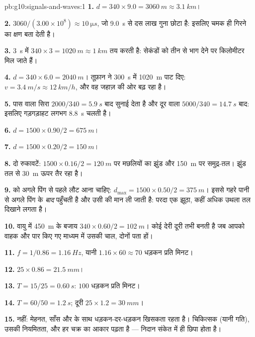 \begin{solution}{pb:g10:signals-and-waves:1}
\textbf{1.} $d = 340 \times 9.0 = \qty{3060}{m} \approx \qty{3.1}{km}$।

\textbf{2.} $3060/(3.00\times10^{8}) \approx \qty{10}{\micro s}$, जो \qty{9.0}{s} से दस लाख गुना छोटा है: इसलिए चमक ही
गिरने का क्षण बता देती है।

\textbf{3.} \qty{3}{s} में  $340 \times 3 = \qty{1020}{m}
\approx \qty{1}{km}$ तय करती है: सेकंडों को तीन
से भाग देने पर किलोमीटर मिल जाते हैं।

\textbf{4.} $d = 340 \times 6.0 = \qty{2040}{m}$। तूफ़ान ने \qty{300}{s} में \qty{1020}{m} पाट दिए: $v = \qty{3.4}{m/s} \approx
\qty{12}{km/h}$, और
वह जहाज़ की ओर बढ़ रहा है।

\textbf{5.} पास वाला सिरा $2000/340 = \qty{5.9}{s}$ बाद सुनाई देता है और दूर वाला $5000/340 = \qty{14.7}{s}$
बाद: इसलिए गड़गड़ाहट लगभग \qty{8.8}{s} चलती है।

\textbf{6.} $d = 1500 \times 0.90/2 = \qty{675}{m}$।

\textbf{7.} $d = 1500 \times 0.20/2 = \qty{150}{m}$।

\textbf{8.} दो रुकावटें: $1500 \times 0.16/2 =
\qty{120}{m}$ पर मछलियों का झुंड और \qty{150}{m} पर
समुद्र-तल। झुंड तल से \qty{30}{m} ऊपर तैर रहा है।

\textbf{9.}  को अगले पिंग से पहले लौट आना चाहिए:
$d_{\max} = 1500 \times 0.50/2 = \qty{375}{m}$। इससे गहरे पानी से  अगले पिंग के \emph{बाद}
पहुँचती है और उसी की मान ली जाती है: परदा एक झूठा, कहीं अधिक उथला तल
दिखाने लगता है।

\textbf{10.} वायु में \qty{450}{m} के बजाय $340 \times 0.60/2 = \qty{102}{m}$। कोई देरी दूरी तभी बनती
है जब आपको वाहक और पार किए गए माध्यम में उसकी चाल, दोनों पता हों।

\textbf{11.} $f = 1/0.86 = \qty{1.16}{Hz}$, यानी $1.16 \times 60
\approx 70$ धड़कन प्रति मिनट।

\textbf{12.} $25 \times 0.86 = \qty{21.5}{mm}$।

\textbf{13.} $T = 15/25 = \qty{0.60}{s}$: $100$ धड़कन प्रति मिनट।

\textbf{14.} $T = 60/50 = \qty{1.2}{s}$; दूरी $25 \times 1.2 = \qty{30}{mm}$।

\textbf{15.} नहीं: मेहनत, साँस और  के साथ 
धड़कन-दर-धड़कन खिसकता रहता है। चिकित्सक  (यानी गति),
उसकी नियमितता, और हर चक्र का आकार पढ़ता है --- निदान संकेत में
ही छिपा होता है।


\end{solution}

